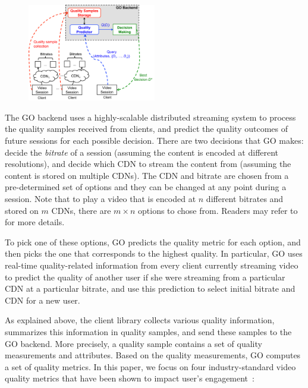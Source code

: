 \begin{figure}[h!]
\centering
 \includegraphics[width=0.5\textwidth] {figures/go-overview.pdf}
\label{fig:go-overview}
\end{figure}
 
The GO backend uses a highly-scalable distributed streaming system to
process the quality samples received from clients, and predict the
quality outcomes of future sessions for each possible decision. There
are two decisions that GO makes: decide the {\it bitrate} of a session
(assuming the content is encoded at different resolutions), and decide
which CDN to stream the content from (assuming the content is stored
on multiple CDNs). The CDN and bitrate are chosen from a
pre-determined set of options and they can be changed at any point
during a session. Note that to play a video that is encoded at $n$
different bitrates and stored on $m$ CDNs, there are $m\times n$
options to chose from.  Readers may refer to~\cite{conext12} for more
details.

To pick one of these options, GO predicts the quality metric for each
option, and then picks the one that corresponds to the highest
quality. In particular, GO uses real-time quality-related information
from every client currently streaming video to predict the quality of
another user if she were streaming from a particular CDN at a
particular bitrate, and use this prediction to select initial bitrate
and CDN for a new user.


\label{subsec:dataset}

As explained above, the client library collects various quality
information, summarizes this information in quality samples, and send
these samples to the GO backend. More precisely, a quality sample
contains a set of quality measurements and attributes. Based on the
quality measurements, GO computes a set of quality metrics. In this
paper, we focus on four industry-standard video quality metrics that
have been shown to impact user's engagement~\cite{sigcomm11}:


